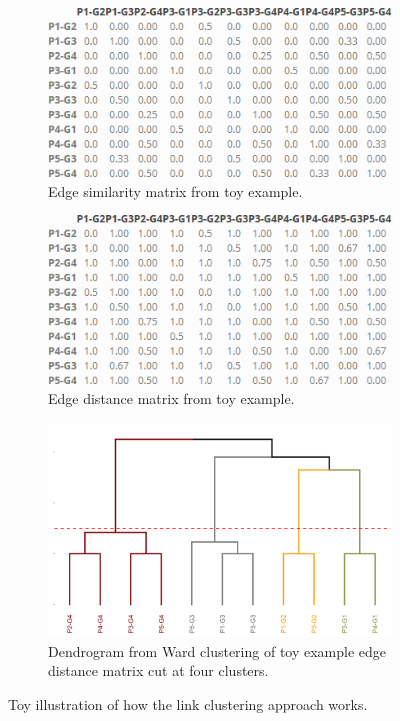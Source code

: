 \documentclass[a4paper,12pt]{extarticle}
\begin{document}
\begin{figure}
    \centering
     \begin{subfigure}[b]{0.6\textwidth}
        \includegraphics[width=1.0\textwidth]{Toy/toy-sim.png}
        \caption{Edge similarity matrix from toy example.}
        \label{tab:toy-sim}
    \end{subfigure}
     \begin{subfigure}[b]{0.6\textwidth}
        \includegraphics[width=1.0\textwidth]{Toy/toy-dis.png}
        \caption{Edge distance matrix from toy example.}
        \label{tab:toy-dis}
    \end{subfigure}
     \begin{subfigure}[b]{0.6\textwidth}
        \includegraphics[width=1.0\textwidth]{Toy/link-clust-toy.png}
        \caption{Dendrogram from Ward clustering of toy example edge distance matrix cut at four clusters.}
        \label{fig:link-toy}
    \end{subfigure}
    \caption{Toy illustration of how the link clustering approach works.}
    \label{fig:link-toy-ex}
 \end{figure}
\end{document}
